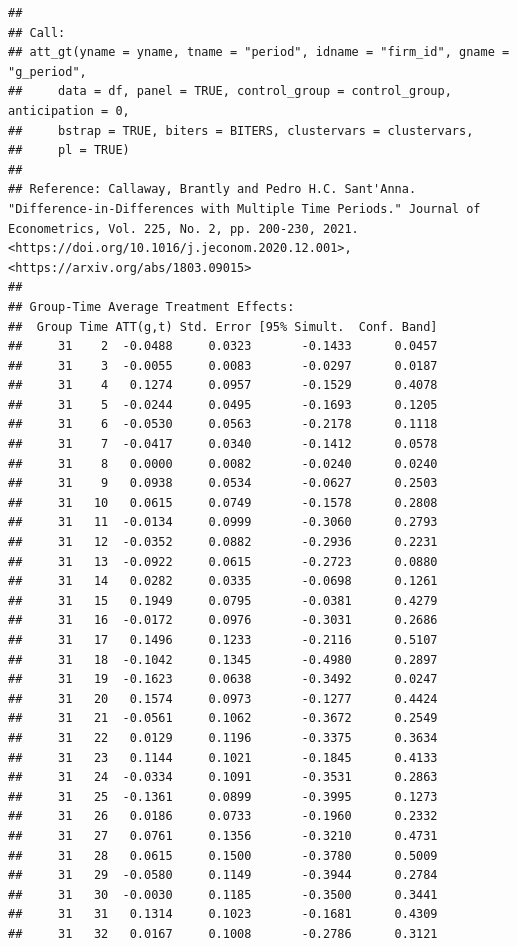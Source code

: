 \documentclass[
]{article}
\begin{document}
\begin{verbatim}
## 
## Call:
## att_gt(yname = yname, tname = "period", idname = "firm_id", gname = "g_period", 
##     data = df, panel = TRUE, control_group = control_group, anticipation = 0, 
##     bstrap = TRUE, biters = BITERS, clustervars = clustervars, 
##     pl = TRUE)
## 
## Reference: Callaway, Brantly and Pedro H.C. Sant'Anna.  "Difference-in-Differences with Multiple Time Periods." Journal of Econometrics, Vol. 225, No. 2, pp. 200-230, 2021. <https://doi.org/10.1016/j.jeconom.2020.12.001>, <https://arxiv.org/abs/1803.09015> 
## 
## Group-Time Average Treatment Effects:
##  Group Time ATT(g,t) Std. Error [95% Simult.  Conf. Band]  
##     31    2  -0.0488     0.0323       -0.1433      0.0457  
##     31    3  -0.0055     0.0083       -0.0297      0.0187  
##     31    4   0.1274     0.0957       -0.1529      0.4078  
##     31    5  -0.0244     0.0495       -0.1693      0.1205  
##     31    6  -0.0530     0.0563       -0.2178      0.1118  
##     31    7  -0.0417     0.0340       -0.1412      0.0578  
##     31    8   0.0000     0.0082       -0.0240      0.0240  
##     31    9   0.0938     0.0534       -0.0627      0.2503  
##     31   10   0.0615     0.0749       -0.1578      0.2808  
##     31   11  -0.0134     0.0999       -0.3060      0.2793  
##     31   12  -0.0352     0.0882       -0.2936      0.2231  
##     31   13  -0.0922     0.0615       -0.2723      0.0880  
##     31   14   0.0282     0.0335       -0.0698      0.1261  
##     31   15   0.1949     0.0795       -0.0381      0.4279  
##     31   16  -0.0172     0.0976       -0.3031      0.2686  
##     31   17   0.1496     0.1233       -0.2116      0.5107  
##     31   18  -0.1042     0.1345       -0.4980      0.2897  
##     31   19  -0.1623     0.0638       -0.3492      0.0247  
##     31   20   0.1574     0.0973       -0.1277      0.4424  
##     31   21  -0.0561     0.1062       -0.3672      0.2549  
##     31   22   0.0129     0.1196       -0.3375      0.3634  
##     31   23   0.1144     0.1021       -0.1845      0.4133  
##     31   24  -0.0334     0.1091       -0.3531      0.2863  
##     31   25  -0.1361     0.0899       -0.3995      0.1273  
##     31   26   0.0186     0.0733       -0.1960      0.2332  
##     31   27   0.0761     0.1356       -0.3210      0.4731  
##     31   28   0.0615     0.1500       -0.3780      0.5009  
##     31   29  -0.0580     0.1149       -0.3944      0.2784  
##     31   30  -0.0030     0.1185       -0.3500      0.3441  
##     31   31   0.1314     0.1023       -0.1681      0.4309  
##     31   32   0.0167     0.1008       -0.2786      0.3121  

\end{verbatim}
\end{document}
